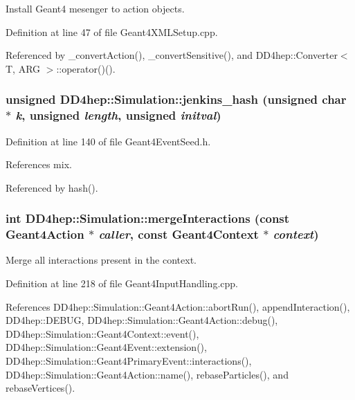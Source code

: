 Install Geant4 mesenger to action objects. 

Definition at line 47 of file Geant4XMLSetup.cpp.

Referenced by \_\-convertAction(), \_\-convertSensitive(), and DD4hep::Converter$<$ T, ARG $>$::operator()().\hypertarget{namespace_d_d4hep_1_1_simulation_a7a70f98f660222ddbf5b8dea8ffd1bb6}{
\subsubsection[{jenkins\_\-hash}]{\setlength{\rightskip}{0pt plus 5cm}unsigned DD4hep::Simulation::jenkins\_\-hash (unsigned char $\ast$ {\em k}, \/  unsigned {\em length}, \/  unsigned {\em initval})}}
\label{namespace_d_d4hep_1_1_simulation_a7a70f98f660222ddbf5b8dea8ffd1bb6}


Definition at line 140 of file Geant4EventSeed.h.

References mix.

Referenced by hash().\hypertarget{namespace_d_d4hep_1_1_simulation_a443dcc90d4d35ae2cab73956bbd2a2d8}{
\subsubsection[{mergeInteractions}]{\setlength{\rightskip}{0pt plus 5cm}int DD4hep::Simulation::mergeInteractions (const {\bf Geant4Action} $\ast$ {\em caller}, \/  const {\bf Geant4Context} $\ast$ {\em context})}}
\label{namespace_d_d4hep_1_1_simulation_a443dcc90d4d35ae2cab73956bbd2a2d8}


Merge all interactions present in the context. 

Definition at line 218 of file Geant4InputHandling.cpp.

References DD4hep::Simulation::Geant4Action::abortRun(), appendInteraction(), DD4hep::DEBUG, DD4hep::Simulation::Geant4Action::debug(), DD4hep::Simulation::Geant4Context::event(), DD4hep::Simulation::Geant4Event::extension(), DD4hep::Simulation::Geant4PrimaryEvent::interactions(), DD4hep::Simulation::Geant4Action::name(), rebaseParticles(), and rebaseVertices().

